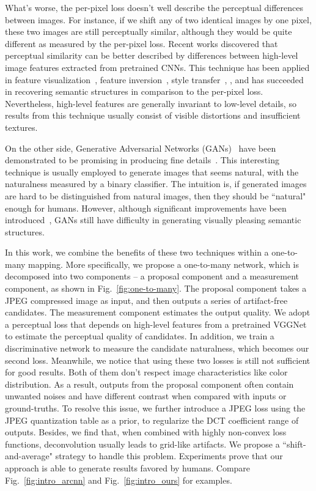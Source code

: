 \documentclass[10pt,twocolumn,letterpaper]{article}
\begin{document}
What's worse, the per-pixel loss doesn't well describe the perceptual differences between images. For instance, if we shift any of two identical images by one pixel, these two images are still perceptually similar, although they would be quite different as measured by the per-pixel loss. Recent works discovered that perceptual similarity can be better described by differences between high-level image features extracted from pretrained CNNs. This technique has been applied in feature visualization~\cite{feature_visualization}, feature inversion~\cite{feature_inversion}, style transfer~\cite{style_transfer,artistic_style}, \etc, and has succeeded in recovering semantic structures in comparison to the per-pixel loss. Nevertheless, high-level features are generally invariant to low-level details, so results from this technique usually consist of visible distortions and insufficient textures. 

On the other side, Generative Adversarial Networks (GANs)~\cite{gan} have been demonstrated to be promising in producing fine details~\cite{gan,lapgan,dcgan}. This interesting technique is usually employed to generate images that seems natural, with the naturalness measured by a binary classifier. The intuition is, if generated images are hard to be distinguished from natural images, then they should be ``natural" enough for humans. However, although significant improvements have been introduced~\cite{lapgan,dcgan}, GANs still have difficulty in generating visually pleasing semantic structures.

In this work, we combine the benefits of these two techniques within a one-to-many mapping. More specifically, we propose a one-to-many network, which is decomposed into two components -- a proposal component and a measurement component, as shown in Fig.~\ref{fig:one-to-many}. The proposal component takes a JPEG compressed image as input, and then outputs a series of artifact-free candidates. The measurement component estimates the output quality. We adopt a perceptual loss that depends on high-level features from a pretrained VGGNet~\cite{vggnet} to estimate the perceptual quality of candidates. In addition, we train a discriminative network to measure the candidate naturalness, which becomes our second loss. Meanwhile, we notice that using these two losses is still not sufficient for good results. Both of them don't respect image characteristics like color distribution. As a result, outputs from the proposal component often contain unwanted noises and have different contrast when compared with inputs or ground-truths. To resolve this issue, we further introduce a JPEG loss using the JPEG quantization table as a prior, to regularize the DCT coefficient range of outputs. Besides, we find that, when combined with highly non-convex loss functions, deconvolution usually leads to grid-like artifacts. We propose a ``shift-and-average" strategy to handle this problem. Experiments prove that our approach is able to generate results favored by humans. Compare Fig.~\ref{fig:intro_arcnn} and Fig.~\ref{fig:intro_ours} for examples.
\end{document}
